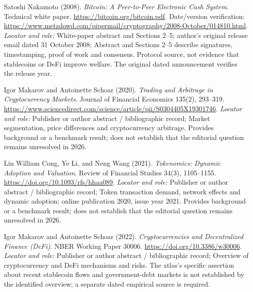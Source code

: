 \documentclass[11pt,a4paper]{article}
\begin{document}
\begin{enumerate}[label={[S\arabic*]},leftmargin=*]

\item Satoshi Nakamoto (2008). \emph{Bitcoin: A Peer-to-Peer Electronic Cash System}. Technical white paper. \url{https://bitcoin.org/bitcoin.pdf}. Date/version verification: \url{https://www.metzdowd.com/pipermail/cryptography/2008-October/014810.html}.
\textit{Locator and role:} White-paper abstract and Sections 2–5; author’s original release email dated 31 October 2008; Abstract and Sections 2–5 describe signatures, timestamping, proof of work and consensus. Protocol source, not evidence that stablecoins or DeFi improve welfare. The original dated announcement verifies the release year.

\item Igor Makarov and Antoinette Schoar (2020). \emph{Trading and Arbitrage in Cryptocurrency Markets}. Journal of Financial Economics 135(2), 293–319. \url{https://www.sciencedirect.com/science/article/pii/S0304405X19301746}.
\textit{Locator and role:} Publisher or author abstract / bibliographic record; Market segmentation, price differences and cryptocurrency arbitrage. Provides background or a benchmark result; does not establish that the editorial question remains unresolved in 2026.

\item Lin William Cong, Ye Li, and Neng Wang (2021). \emph{Tokenomics: Dynamic Adoption and Valuation}. Review of Financial Studies 34(3), 1105–1155. \url{https://doi.org/10.1093/rfs/hhaa089}.
\textit{Locator and role:} Publisher or author abstract / bibliographic record; Token transaction demand, network effects and dynamic adoption; online publication 2020, issue year 2021. Provides background or a benchmark result; does not establish that the editorial question remains unresolved in 2026.

\item Igor Makarov and Antoinette Schoar (2022). \emph{Cryptocurrencies and Decentralized Finance (DeFi)}. NBER Working Paper 30006. \url{https://doi.org/10.3386/w30006}.
\textit{Locator and role:} Publisher or author abstract / bibliographic record; Overview of cryptocurrency and DeFi mechanisms and risks. The atlas’s specific assertion about recent stablecoin flows and government-debt markets is not established by the identified overview; a separate dated empirical source is required.

\end{enumerate}
\end{document}
